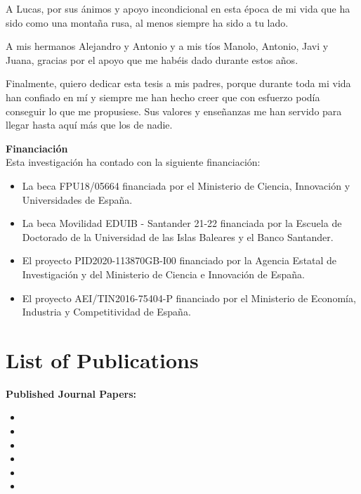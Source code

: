 \documentclass[
    colorlinks, 
    libertine,
]{uninathesis}
\theoremstyle{plain}
\begin{document}
A Lucas, por sus ánimos y apoyo incondicional en esta época de mi vida que ha sido como una montaña rusa, al menos siempre ha sido a tu lado.

A mis hermanos Alejandro y Antonio y a mis tíos Manolo, Antonio, Javi y Juana, gracias por el apoyo que me habéis dado durante estos años. 

Finalmente, quiero dedicar esta tesis a mis padres, porque durante toda mi vida han confiado en mí y siempre me han hecho creer que con esfuerzo podía conseguir lo que me propusiese. Sus valores y enseñanzas me han servido para llegar hasta aquí más que los de nadie.

\vspace{0.5cm}

\noindent \textbf{Financiación}\\

\noindent Esta investigación ha contado con la siguiente financiación:
\begin{itemize}
	\item La beca FPU18/05664 financiada por el Ministerio de Ciencia, Innovación y Universidades de España.
	\item La beca Movilidad EDUIB - Santander 21-22 financiada por la Escuela de Doctorado de la Universidad de las Islas Baleares y el Banco Santander.
	\item El proyecto PID2020-113870GB-I00 financiado por la Agencia Estatal de Investigación y del Ministerio de Ciencia e Innovación de España.
	\item El proyecto AEI/TIN2016-75404-P financiado por el Ministerio de Economía, Industria y Competitividad de España.
\end{itemize}


\pagestyle{backmatter}
\chapter*{List of Publications}

\textbf{Published Journal Papers:}
\begin{itemize}
	\item {}
	\item {}
	\item {}
	\item {}
	\item {}
	\item {}
\end{itemize}
\end{document}
